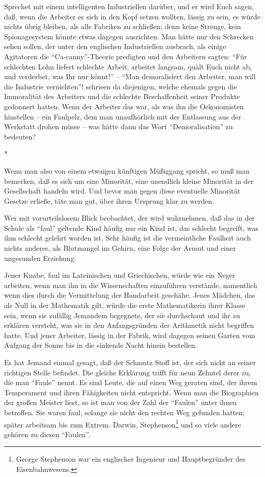 \documentclass{scrbook}
\begin{document}
Sprechet mit einem intelligenten Industriellen darüber, und er wird Euch sagen, daß, wenn die Arbeiter es sich in den Kopf setzen wollten, lässig zu sein, es würde nichts übrig bleiben, als alle Fabriken zu schließen; denn keine Strenge, kein Spionagesystem könnte etwas dagegen ausrichten. Man hätte nur den Schrecken sehen sollen, der unter den englischen Industriellen ausbrach, als einige Agitatoren die ``Ca-canny''-Theorie predigten und den Arbeitern sagten: ``Für schlechten Lohn liefert schlechte Arbeit, arbeitet langsam, quält Euch nicht ab, und verderbet, was Ihr nur könnt!'' – ``Man demoralisiert den Arbeiter, man will die Industrie vernichten''! schrieen da diejenigen, welche ehemals gegen die Immoralität des Arbeiters und die schlechte Beschaffenheit seiner Produkte gedonnert hatten. Wenn der Arbeiter das war, als was ihn die Oekonomisten hinstellen – ein Faulpelz, dem man unaufhörlich mit der Entlassung aus der Werkstatt drohen müsse – was hätte dann das Wort ``Demoralisation'' zu bedeuten?

\begin{center}*\end{center}

Wenn man also von einem etwaigen künftigen Müßiggang spricht, so muß man bemerken, daß es sich um eine Minorität, eine unendlich kleine Minorität in der Gesellschaft handeln wird. Und bevor man gegen diese eventuelle Minorität Gesetze erließe, täte man gut, über ihren Ursprung klar zu werden.

Wer mit vorurteilslosem Blick beobachtet, der wird wahrnehmen, daß das in der Schule als ``faul'' geltende Kind häufig nur ein Kind ist, das schlecht begreift, was ihm schlecht gelehrt worden ist. Sehr häufig ist die vermeintliche Faulheit auch nichts anderes, als Blutmangel im Gehirn, eine Folge der Armut und einer ungesunden Erziehung.

Jener Knabe, faul im Lateinischen und Griechischen, würde wie ein Neger arbeiten, wenn man ihn in die Wissenschaften einzuführen verstände, namentlich wenn dies durch die Vermittelung der Handarbeit geschähe. Jenes Mädchen, das als Null in der Mathematik gilt, würde die erste Mathematikerin ihrer Klasse sein, wenn sie zufällig Jemandem begegnete, der sie durchschaut und ihr zu erklären versteht, was sie in den Anfangsgründen der Arithmetik nicht begriffen hatte. Und jener Arbeiter, lässig in der Fabrik, wird dagegen seinen Garten vom Aufgang der Sonne bis in die sinkende Nacht hinein bestellen.

Es hat Jemand einmal gesagt, daß der Schmutz Stoff ist, der sich nicht an seiner richtigen Stelle befindet. Die gleiche Erklärung trifft für neun Zehntel derer zu, die man ``Faule'' nennt. Es sind Leute, die auf einen Weg geraten sind, der ihrem Temperament und ihren Fähigkeiten nicht entspricht. Wenn man die Biographien der großen Meister liest, so ist man von der Zahl der ``Faulen'' unter ihnen betroffen. Sie waren faul, solange sie nicht den rechten Weg gefunden hatten; später arbeitsam bis zum Extrem. Darwin, Stephenson\footnote{George Stephenson war ein englischer Ingenieur und Hauptbegründer des Eisenbahnwesens.} und so viele andere gehören zu diesen ``Faulen''.
\end{document}
